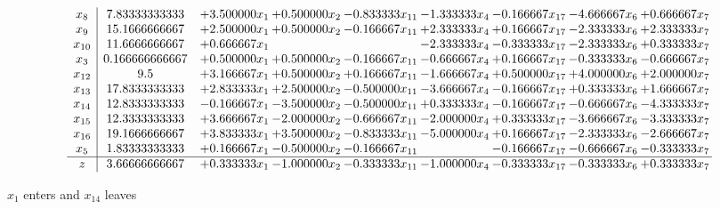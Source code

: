 \documentclass[10pt]{article}
\begin{document}
 \[\begin{array}{c| c c@{\hskip 2pt} c@{\hskip 2pt} c@{\hskip 2pt} c@{\hskip 2pt} c@{\hskip 2pt} c@{\hskip 2pt} c@{\hskip 2pt} }
 x_{8}   &  7.83333333333 & + 3.500000 x_{1} & + 0.500000 x_{2} & -0.833333 x_{11} & -1.333333 x_{4} & -0.166667 x_{17} & -4.666667 x_{6} & + 0.666667 x_{7}\\
 x_{9}   &  15.1666666667 & + 2.500000 x_{1} & + 0.500000 x_{2} & -0.166667 x_{11} & + 2.333333 x_{4} & + 0.166667 x_{17} & -2.333333 x_{6} & + 2.333333 x_{7}\\
 x_{10}   &  11.6666666667 & + 0.666667 x_{1} &    &   & -2.333333 x_{4} & -0.333333 x_{17} & -2.333333 x_{6} & + 0.333333 x_{7}\\
 x_{3}   &  0.166666666667 & + 0.500000 x_{1} & + 0.500000 x_{2} & -0.166667 x_{11} & -0.666667 x_{4} & + 0.166667 x_{17} & -0.333333 x_{6} & -0.666667 x_{7}\\
 x_{12}   &  9.5 & + 3.166667 x_{1} & + 0.500000 x_{2} & + 0.166667 x_{11} & -1.666667 x_{4} & + 0.500000 x_{17} & + 4.000000 x_{6} & + 2.000000 x_{7}\\
 x_{13}   &  17.8333333333 & + 2.833333 x_{1} & + 2.500000 x_{2} & -0.500000 x_{11} & -3.666667 x_{4} & -0.166667 x_{17} & + 0.333333 x_{6} & + 1.666667 x_{7}\\
 x_{14}   &  12.8333333333 & -0.166667 x_{1} & -3.500000 x_{2} & -0.500000 x_{11} & + 0.333333 x_{4} & -0.166667 x_{17} & -0.666667 x_{6} & -4.333333 x_{7}\\
 x_{15}   &  12.3333333333 & + 3.666667 x_{1} & -2.000000 x_{2} & -0.666667 x_{11} & -2.000000 x_{4} & + 0.333333 x_{17} & -3.666667 x_{6} & -3.333333 x_{7}\\
 x_{16}   &  19.1666666667 & + 3.833333 x_{1} & + 3.500000 x_{2} & -0.833333 x_{11} & -5.000000 x_{4} & + 0.166667 x_{17} & -2.333333 x_{6} & -2.666667 x_{7}\\
 x_{5}   &  1.83333333333 & + 0.166667 x_{1} & -0.500000 x_{2} & -0.166667 x_{11} &   & -0.166667 x_{17} & -0.666667 x_{6} & -0.333333 x_{7}\\
\hline
z    &  3.66666666667 & + 0.333333 x_{1} & -1.000000 x_{2} & -0.333333 x_{11} & -1.000000 x_{4} & -0.333333 x_{17} & -0.333333 x_{6} & + 0.333333 x_{7}\\
\end{array}\]


 $ x_{1} $ enters and $ x_{14} $ leaves 
\end{document}
